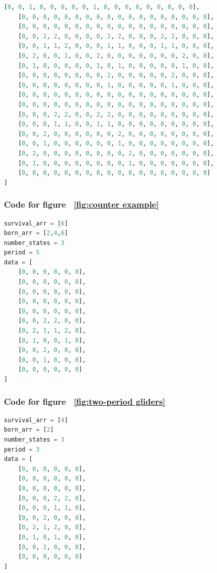 \documentclass[12pt]{article}
\numberwithin{figure}{section} %
\begin{document}
\begin{lstlisting}[language = Python]
    [0, 0, 1, 0, 0, 0, 0, 0, 1, 0, 0, 0, 0, 0, 0, 0, 0, 0],
    [0, 0, 0, 0, 0, 0, 0, 0, 0, 0, 0, 0, 0, 0, 0, 0, 0, 0],
    [0, 0, 0, 0, 0, 0, 0, 0, 0, 0, 0, 0, 0, 0, 0, 0, 0, 0],  
    [0, 0, 2, 2, 0, 0, 0, 0, 2, 2, 0, 0, 0, 2, 2, 0, 0, 0],
    [0, 0, 1, 1, 2, 0, 0, 0, 1, 1, 0, 0, 0, 1, 1, 0, 0, 0],
    [0, 2, 0, 0, 1, 0, 0, 2, 0, 0, 0, 0, 0, 0, 0, 2, 0, 0],
    [0, 1, 0, 0, 0, 0, 0, 1, 0, 1, 0, 0, 0, 0, 0, 1, 0, 0],
    [0, 0, 0, 0, 0, 0, 0, 0, 2, 0, 0, 0, 0, 0, 2, 0, 0, 0],
    [0, 0, 0, 0, 0, 0, 0, 0, 1, 0, 0, 0, 0, 0, 1, 0, 0, 0],
    [0, 0, 0, 0, 0, 0, 0, 0, 0, 0, 0, 0, 0, 0, 0, 0, 0, 0],
    [0, 0, 0, 0, 0, 0, 0, 0, 0, 0, 0, 0, 0, 0, 0, 0, 0, 0], 
    [0, 0, 0, 2, 2, 0, 0, 2, 2, 0, 0, 0, 0, 0, 0, 0, 0, 0],
    [0, 0, 0, 1, 1, 0, 0, 1, 1, 0, 0, 0, 0, 0, 0, 0, 0, 0],
    [0, 0, 2, 0, 0, 0, 0, 0, 0, 2, 0, 0, 0, 0, 0, 0, 0, 0],
    [0, 0, 1, 0, 0, 0, 0, 0, 0, 1, 0, 0, 0, 0, 0, 0, 0, 0],
    [0, 2, 0, 0, 0, 0, 0, 0, 0, 0, 2, 0, 0, 0, 0, 0, 0, 0],
    [0, 1, 0, 0, 0, 0, 0, 0, 0, 0, 1, 0, 0, 0, 0, 0, 0, 0],
    [0, 0, 0, 0, 0, 0, 0, 0, 0, 0, 0, 0, 0, 0, 0, 0, 0, 0] 
]
\end{lstlisting}
\noindent\begin{minipage}{.45\textwidth}
\subsubsection{Code for figure ~\ref{fig:counter example}}
\label{subsubsection:counter example}
\begin{lstlisting}[language = Python]
survival_arr = [6]
born_arr = [2,4,6]
number_states = 3
period = 5
data = [
    [0, 0, 0, 0, 0, 0],
    [0, 0, 0, 0, 0, 0],
    [0, 0, 0, 0, 0, 0],
    [0, 0, 0, 0, 0, 0],
    [0, 0, 0, 0, 0, 0],
    [0, 0, 2, 2, 0, 0], 
    [0, 2, 1, 1, 2, 0], 
    [0, 1, 0, 0, 1, 0], 
    [0, 0, 2, 0, 0, 0], 
    [0, 0, 1, 0, 0, 0], 
    [0, 0, 0, 0, 0, 0]
]
\end{lstlisting}
\end{minipage}
\hfill
\begin{minipage}{.45\textwidth}
\subsubsection{Code for figure ~\ref{fig:two-period gliders}}
\label{subsubsection:two-period gliders(1/5)}
\begin{lstlisting}[language = Python]
survival_arr = [4]
born_arr = [2]
number_states = 3
period = 3
data = [
    [0, 0, 0, 0, 0, 0],
    [0, 0, 0, 0, 0, 0],
    [0, 0, 0, 0, 0, 0],
    [0, 0, 0, 2, 2, 0],
    [0, 0, 0, 1, 1, 0],
    [0, 0, 2, 0, 0, 0],
    [0, 2, 1, 2, 0, 0],
    [0, 1, 0, 1, 0, 0],
    [0, 0, 2, 0, 0, 0],
    [0, 0, 0, 0, 0, 0]
]
\end{lstlisting}
\end{minipage}
\end{document}
